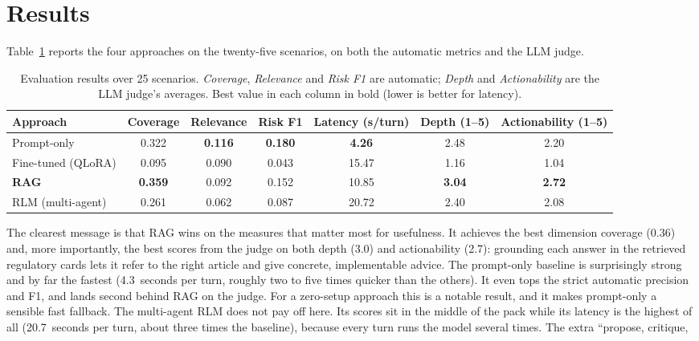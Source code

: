 \documentclass[11pt]{article}
\begin{document}
\section{Results}
\label{sec:results}
Table~\ref{tab:results} reports the four approaches on the twenty-five scenarios, on both
the automatic metrics and the LLM judge.
\begin{table}[t]
  \centering
  \footnotesize
  \setlength{\tabcolsep}{6pt}
  \begin{tabular}{|l|c|c|c|c|c|c|}
    \hline
    \textbf{Approach} & \textbf{Coverage} & \textbf{Relevance} & \textbf{Risk F1} &
    \textbf{Latency (s/turn)} & \textbf{Depth (1--5)} & \textbf{Actionability (1--5)} \\
    \hline
    Prompt-only & 0.322 & \textbf{0.116} & \textbf{0.180} & \textbf{4.26} & 2.48 & 2.20 \\
    \hline
    Fine-tuned (QLoRA) & 0.095 & 0.090 & 0.043 & 15.47 & 1.16 & 1.04 \\
    \hline
    \textbf{RAG} & \textbf{0.359} & 0.092 & 0.152 & 10.85 & \textbf{3.04} & \textbf{2.72} \\
    \hline
    RLM (multi-agent) & 0.261 & 0.062 & 0.087 & 20.72 & 2.40 & 2.08 \\
    \hline
  \end{tabular}
  \caption{Evaluation results over 25 scenarios. \emph{Coverage}, \emph{Relevance} and
  \emph{Risk F1} are automatic; \emph{Depth} and \emph{Actionability} are the LLM judge's
  averages. Best value in each column in bold (lower is better for latency).}
  \label{tab:results}
\end{table}
The clearest message is that RAG wins on the measures that matter most for
usefulness. It achieves the best dimension coverage (0.36) and, more importantly, the
best scores from the judge on both depth (3.0) and actionability (2.7): grounding each
answer in the retrieved regulatory cards lets it refer to the right article and give
concrete, implementable advice.
The prompt-only baseline is surprisingly strong and by far the fastest
(4.3~seconds per turn, roughly two to five times quicker than the others). It even tops
the strict automatic precision and F1, and lands second behind RAG on the judge. For a
zero-setup approach this is a notable result, and it makes prompt-only a sensible fast
fallback.
The multi-agent RLM does not pay off here. Its scores sit in the middle of the
pack while its latency is the highest of all (20.7~seconds per turn, about three times the
baseline), because every turn runs the model several times. The extra ``propose, critique,
\end{document}
